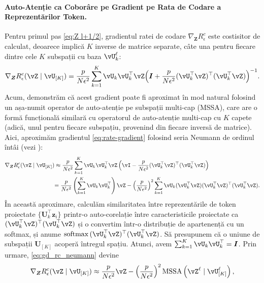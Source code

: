 \documentclass[../../book-main_ro.tex]{subfiles}
\begin{document}
\paragraph{Auto-Atenție ca Coborâre pe Gradient pe Rata de Codare a Reprezentărilor Token.} Pentru primul pas \eqref{eq:Z l+1/2}, gradientul ratei de codare \(\nabla_{\bm Z} R^c_\epsilon\) este costisitor de calculat, deoarece implică \(K\) inverse de matrice separate, câte una pentru fiecare dintre cele \(K\) subspații cu baza \(\vU_{k}^{\ell}\):
\begin{equation}
    \nabla_{\bm Z} R_{\epsilon}^c(\vZ \mid \vU_{[K]})
    = \frac{p}{N\epsilon^2}\sum_{k=1}^K \vU_k\vU_k^\top\vZ\Big(\I +
    \frac{p}{N\epsilon^2}(\vU_k^\top\vZ)^\top(\vU_k^\top\vZ)\Big)^{-1}.
    \label{eq:rate-gradient}
\end{equation}
Acum, demonstrăm că acest gradient poate fi aproximat în mod natural folosind un așa-numit operator de auto-atenție pe subspații multi-cap (MSSA), care are o formă funcțională similară cu operatorul de auto-atenție multi-cap \citep{vaswani2017attention} cu \(K\) capete (adică, unul pentru fiecare subspațiu, provenind din fiecare inversă de matrice). Aici, aproximăm gradientul \eqref{eq:rate-gradient} folosind seria Neumann de ordinul întâi (vezi ):
\begin{align}\label{eq:gd_rc_neumann}
    \nabla_{\bm Z} R_{\epsilon}^{c}(\vZ \mid \vU_{[K]}) 
    &\approx \frac{p}{N\epsilon^2} \sum_{k = 1}^{K}\vU_{k}\vU_{k}^\top\vZ\left(\vI - \frac{p}{N\epsilon^2} (\vU_{k}^\top\vZ)^\top(\vU_{k}^\top\vZ)\right) \notag \\
    &{= \frac{p}{N\epsilon^2} \left(\sum_{k = 1}^{K} \vU_{k}\vU_{k}^\top\right)\vZ -  \left( \frac{p}{N\epsilon^2}\right)^2\sum_{k = 1}^{K} \vU_{k}(\vU_{k}^\top\vZ)(\vU_{k}^\top\vZ)^\top(\vU_{k}^\top\vZ)}.
\end{align}
În această aproximare, calculăm similaritatea între reprezentările de token proiectate $\{\bm U_k^\top\bm z_i\}$ printr-o auto-corelație între caracteristicile proiectate ca $(\vU_{k}^\top\vZ)^\top(\vU_{k}^\top\vZ)$ și o convertim într-o distribuție de apartenență cu un softmax, și anume $\softmax{(\vU_{k}^\top\vZ)^\top(\vU_{k}^\top\vZ)}$.
Să presupunem că o uniune de subspații $\bm U_{[K]}$ acoperă întregul spațiu. Atunci, avem $\sum_{k = 1}^{K} \vU_{k}\vU_{k}^\top = \bm I$. Prin urmare, \eqref{eq:gd_rc_neumann} devine
\begin{align}\label{eq:grad Rc}
    \nabla_{\bm Z} R_{\epsilon}^{c}(\vZ \mid \vU_{[K]}) 
     \approx  \frac{p}{N\epsilon^2} \vZ -  \left( \frac{p}{N\epsilon^2}\right)^2 \MSSA\left(\vZ^{\ell} \mid \vU_{[K]}^{\ell}\right),
\end{align}
\end{document}
